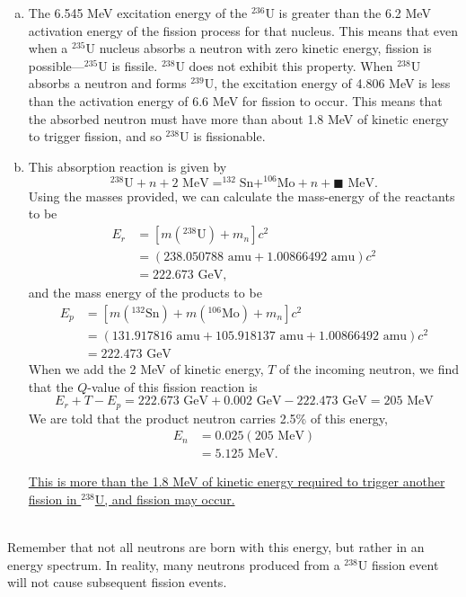 \documentclass{report}
\begin{document}
\begin{enumerate}[a)]
\item

The 6.545 MeV excitation energy of the $^{236}$U is greater than the 6.2 MeV activation energy of the fission process for that nucleus. This means that even when a $^{235}$U nucleus absorbs a neutron with zero kinetic energy, fission is possible---$^{235}$U is fissile. $^{238}$U does not exhibit this property. When $^{238}$U absorbs a neutron and forms $^{239}$U, the excitation energy of 4.806 MeV is less than the activation energy of 6.6 MeV for fission to occur. This means that the absorbed neutron must have more than about 1.8 MeV of kinetic energy to trigger fission, and so $^{238}$U is fissionable.


\item

This absorption reaction is given by
$$ ^{238}\text{U} + n + 2\text{ MeV} = ^{132}\text{Sn} + ^{106}\text{Mo} + n + \blacksquare\text{ MeV} .$$
Using the masses provided, we can calculate the mass-energy of the reactants to be
\begin{align*}
E_r	&= \left[m(^{238}\text{U}) + m_n\right]c^2 \\
	&= \left(238.050788\text{ amu} + 1.00866492\text{ amu}\right)c^2 \\
	&= 222.673\text{ GeV},
\end{align*}
and the mass energy of the products to be
\begin{align*}
E_p	&= \left[m(^{132}\text{Sn}) + m(^{106}\text{Mo}) + m_n\right]c^2 \\
	&= \left(131.917816\text{ amu} + 105.918137\text{ amu} + 1.00866492\text{ amu}\right)c^2 \\
	&= 222.473\text{ GeV}
\end{align*}
When we add the 2 MeV of kinetic energy, $T$ of the incoming neutron, we find that the $Q$-value of this fission reaction is
$$ E_r + T - E_p = 222.673\text{ GeV}
 + 0.002\text{ GeV} - 222.473\text{ GeV} = 205\text{ MeV} $$
We are told that the product neutron carries 2.5\% of this energy,
\begin{align*}
E_n	&= 0.025(205\text{ MeV}) \\
	&= 5.125\text{ MeV}. 
\end{align*}

\underline{This is more than the 1.8 MeV of kinetic energy required to trigger another fission in $^{238}$U, and fission may occur.}
\end{enumerate}
\-\\
{\small *Remember that not all neutrons are born with this energy, but rather in an energy spectrum. In reality, many neutrons produced from a $^{238}$U fission event will not cause subsequent fission events.} 
\end{document}
